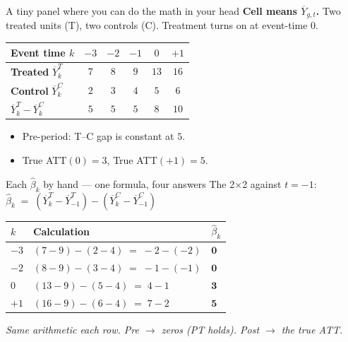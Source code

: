 \documentclass[aspectratio=169,11pt]{beamer}
\begin{document}
\begin{frame}{A tiny panel where you can do the math in your head}
\footnotesize
\textbf{Cell means $\overline{Y}_{g,t}$.} \;Two treated units (T), two controls (C). \;Treatment turns on at event-time $0$.
\vspace{0.4em}
\begin{center}
\renewcommand{\arraystretch}{1.2}
\begin{tabular}{@{}lccccc@{}}
\toprule
\textbf{Event time $k$} & $-3$ & $-2$ & $-1$ & $0$ & $+1$ \\
\midrule
\textbf{Treated} \;$\overline{Y}^T_k$ & $7$ & $8$ & $9$ & $13$ & $16$ \\
\textbf{Control} \;$\overline{Y}^C_k$ & $2$ & $3$ & $4$ & $5$ & $6$ \\
\midrule
$\overline{Y}^T_k - \overline{Y}^C_k$ & $5$ & $5$ & $5$ & $8$ & $10$ \\
\bottomrule
\end{tabular}
\end{center}

\vspace{0.5em}
\begin{itemize}\setlength\itemsep{2pt}
  \item Pre-period: T--C gap is constant at $5$. \;
  \item True ATT$(0) = 3$, \;True ATT$(+1) = 5$.
\end{itemize}
\end{frame}

\begin{frame}{Each $\hat\beta_k$ by hand --- one formula, four answers}
\footnotesize
The 2$\times$2 against $t = -1$: \;$\hat\beta_k \;=\; (\overline{Y}^T_k - \overline{Y}^T_{-1}) - (\overline{Y}^C_k - \overline{Y}^C_{-1})$

\vspace{0.5em}
\begin{center}
\renewcommand{\arraystretch}{1.5}
\begin{tabular}{@{}lll@{}}
\toprule
\textbf{$k$} & \textbf{Calculation} & \textbf{$\hat\beta_k$} \\
\midrule
$-3$ & $(7 - 9) - (2 - 4) \;=\; -2 - (-2)$ & $\mathbf{0}$ \\
$-2$ & $(8 - 9) - (3 - 4) \;=\; -1 - (-1)$ & $\mathbf{0}$ \\
$0$  & $(13 - 9) - (5 - 4) \;=\; 4 - 1$    & $\mathbf{3}$ \\
$+1$ & $(16 - 9) - (6 - 4) \;=\; 7 - 2$    & $\mathbf{5}$ \\
\bottomrule
\end{tabular}
\end{center}

\vspace{0.5em}
\begin{center}
\small\color{warmgray}\itshape Same arithmetic each row. Pre $\to$ zeros (PT holds). Post $\to$ the true ATT.
\end{center}
\end{frame}
\end{document}
